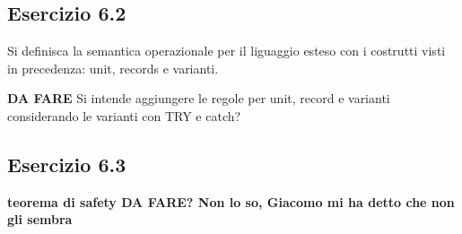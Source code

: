 \subsection*{Esercizio 6.2}
Si definisca la semantica operazionale per il liguaggio esteso con i costrutti visti in precedenza: unit, records e varianti.


\textbf{{\color{red} DA FARE}}
Si intende aggiungere le regole per unit, record e varianti considerando le varianti con TRY e catch?

\subsection*{Esercizio 6.3}

\textbf{{\color{red} teorema di safety DA FARE? Non lo so, Giacomo mi ha detto che non gli sembra}}